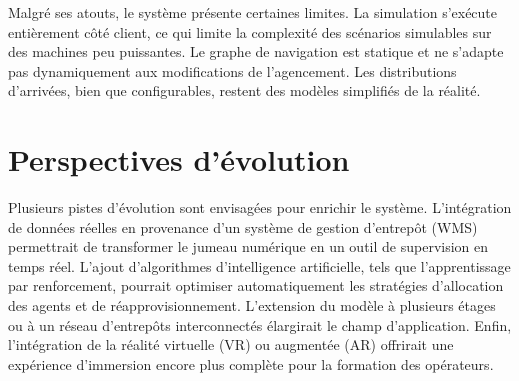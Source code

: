 \documentclass[12pt,a4paper]{report}
\begin{document}
Malgr\'e ses atouts, le syst\`eme pr\'esente certaines limites. La simulation s'ex\'ecute enti\`erement c\^ot\'e client, ce qui limite la complexit\'e des sc\'enarios simulables sur des machines peu puissantes. Le graphe de navigation est statique et ne s'adapte pas dynamiquement aux modifications de l'agencement. Les distributions d'arriv\'ees, bien que configurables, restent des mod\`eles simplifi\'es de la r\'ealit\'e.

\section{Perspectives d'\'evolution}

Plusieurs pistes d'\'evolution sont envisag\'ees pour enrichir le syst\`eme. L'int\'egration de donn\'ees r\'eelles en provenance d'un syst\`eme de gestion d'entrep\^ot (WMS) permettrait de transformer le jumeau num\'erique en un outil de supervision en temps r\'eel. L'ajout d'algorithmes d'intelligence artificielle, tels que l'apprentissage par renforcement, pourrait optimiser automatiquement les strat\'egies d'allocation des agents et de r\'eapprovisionnement. L'extension du mod\`ele \`a plusieurs \'etages ou \`a un r\'eseau d'entrep\^ots interconnect\'es \'elargirait le champ d'application. Enfin, l'int\'egration de la r\'ealit\'e virtuelle (VR) ou augment\'ee (AR) offrirait une exp\'erience d'immersion encore plus compl\`ete pour la formation des op\'erateurs.
\end{document}
